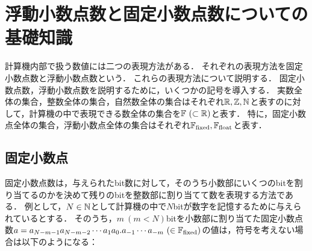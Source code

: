 \chapter{浮動小数点数と固定小数点数についての基礎知識}
\label{chap:基礎知識1}
計算機内部で扱う数値には二つの表現方法がある．
それぞれの表現方法を固定小数点数と浮動小数点数という．
これらの表現方法について説明する．
固定小数点数，浮動小数点数を説明するために，いくつかの記号を導入する．
実数全体の集合，整数全体の集合，自然数全体の集合はそれぞれ$ \mathbb{R}, \mathbb{Z}, \mathbb{N}$と表すのに対して，計算機の中で表現できる数全体の集合を$\mathbb{F} \ (\subset \mathbb{R})$と表す．
特に，固定小数点全体の集合，浮動小数点全体の集合はそれぞれ$\mathbb{F}_{\text{fixed}},\mathbb{F}_{\text{float}}$と表す．



\section{固定小数点}
固定小数点数は，与えられたbit数に対して，そのうち小数部にいくつのbitを割り当てるのかを決めて残りのbitを整数部に割り当てて数を表現する方法である．
例として，$N \in \mathbb{N}$として計算機の中で$N$bitが数字を記憶するために与えられているとする．
そのうち，$m \ (m < N)$bitを小数部に割り当てた固定小数点数$a = a_{N-m-1} a_{N-m-2} \cdots a_1 a_0. a_{-1} \cdots a_{-m} \ (\in \mathbb{F}_{\text{fixed}})$の値は，符号を考えない場合は以下のようになる：

